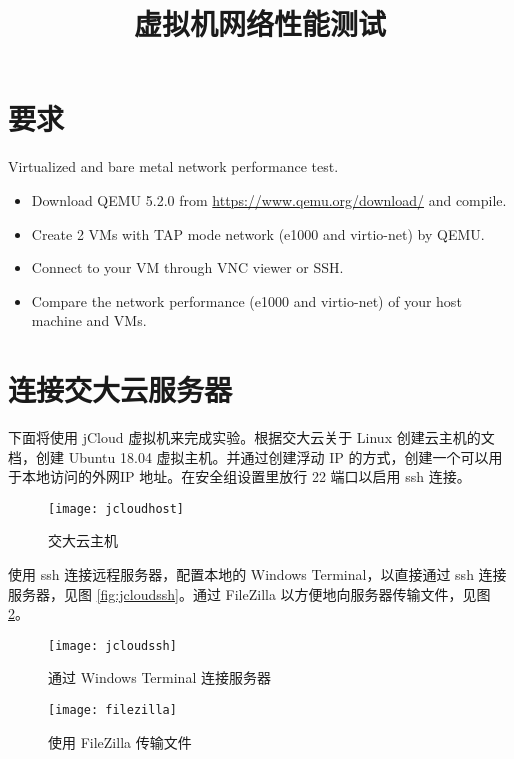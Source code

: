 

    \title{虚拟机网络性能测试}
    \maketitle
    \tableofcontents
    \section*{要求}
    Virtualized and bare metal network performance test.
    \begin{itemize}
        \item Download QEMU 5.2.0 from \href{https://www.qemu.org/download/}{https://www.qemu.org/download/} and compile.
        \item Create 2 VMs with TAP mode network (e1000 and virtio-net) by QEMU.
        \item Connect to your VM through VNC viewer or SSH.
        \item Compare the network performance (e1000 and virtio-net) of your host machine and VMs.
    \end{itemize}
    \section{连接交大云服务器}
    下面将使用 jCloud 虚拟机来完成实验。根据交大云关于 Linux 创建云主机的文档\cite{jcloudlinux}，创建 Ubuntu 18.04 虚拟主机。并通过创建浮动 IP 的方式，创建一个可以用于本地访问的外网IP 地址。在安全组设置里放行 22 端口以启用 ssh 连接。

    \begin{figure}[H]
        \centering
        \texttt{[image: jcloudhost]}
        \caption{交大云主机}\label{fig:jcloudhost}
    \end{figure}

    使用 ssh 连接远程服务器\cite{jcloudssh}，配置本地的 Windows Terminal\cite{winssh}，以直接通过 ssh 连接服务器，见图 \ref{fig:jcloudssh}。通过 FileZilla 以方便地向服务器传输文件，见图 \ref{fig:filezilla}。

    \begin{figure}[H]
        \centering
        \begin{minipage}{0.48\textwidth}
            \centering
            \texttt{[image: jcloudssh]}
            \caption{通过 Windows Terminal 连接服务器}\label{fig:jcloudssh}
        \end{minipage}
        \begin{minipage}{0.48\textwidth}
            \centering
            \texttt{[image: filezilla]}
            \caption{使用 FileZilla 传输文件}\label{fig:filezilla}
        \end{minipage}
    \end{figure}


